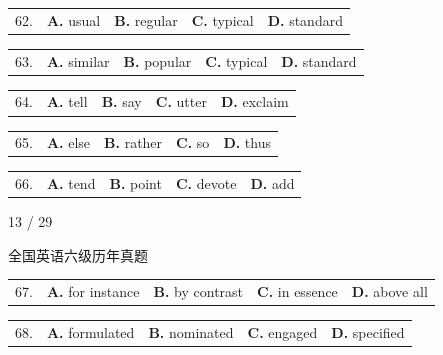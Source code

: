\documentclass[UTF8,11pt]{ctexart}
\begin{document}
\noindent\begin{tabularx}{\linewidth}{@{}lXXXX@{}}62. & \textbf{A.} usual & \textbf{B.} regular & \textbf{C.} typical & \textbf{D.} standard\\\end{tabularx}\par

\noindent\begin{tabularx}{\linewidth}{@{}lXXXX@{}}63. & \textbf{A.} similar & \textbf{B.} popular & \textbf{C.} typical & \textbf{D.} standard\\\end{tabularx}\par

\noindent\begin{tabularx}{\linewidth}{@{}lXXXX@{}}64. & \textbf{A.} tell & \textbf{B.} say & \textbf{C.} utter & \textbf{D.} exclaim\\\end{tabularx}\par

\noindent\begin{tabularx}{\linewidth}{@{}lXXXX@{}}65. & \textbf{A.} else & \textbf{B.} rather & \textbf{C.} so & \textbf{D.} thus\\\end{tabularx}\par

\noindent\begin{tabularx}{\linewidth}{@{}lXXXX@{}}66. & \textbf{A.} tend & \textbf{B.} point & \textbf{C.} devote & \textbf{D.} add\\\end{tabularx}\par

13 / 29


全国英语六级历年真题


\noindent\begin{tabularx}{\linewidth}{@{}lXXXX@{}}67. & \textbf{A.} for instance & \textbf{B.} by contrast & \textbf{C.} in essence & \textbf{D.} above all\\\end{tabularx}\par

\noindent\begin{tabularx}{\linewidth}{@{}lXXXX@{}}68. & \textbf{A.} formulated & \textbf{B.} nominated & \textbf{C.} engaged & \textbf{D.} specified\\\end{tabularx}\par
\end{document}
